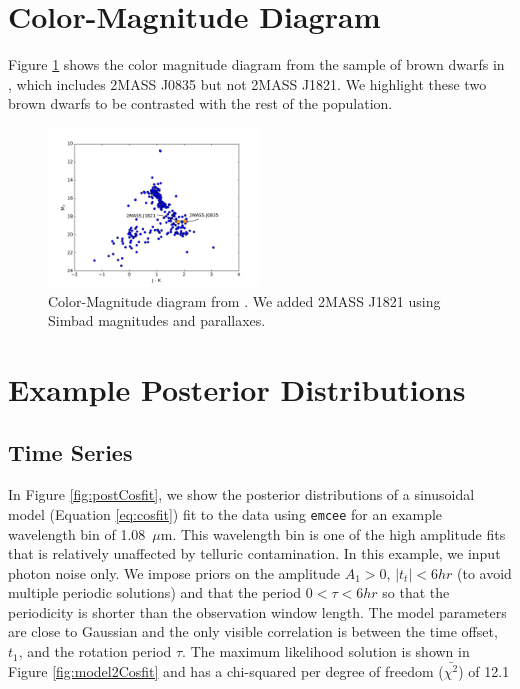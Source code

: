 \documentclass[twocolumn]{aastex6}
\begin{document}
\appendix
\clearpage
\pagebreak

\section{Color-Magnitude Diagram}

Figure \ref{fig:CMD} shows the color magnitude diagram from the sample of brown dwarfs in \citet{dupuy2012ltparallax}, which includes 2MASS J0835 but not 2MASS J1821.
We highlight these two brown dwarfs to be contrasted with the rest of the population.

\begin{figure}
\begin{centering}
\includegraphics[width=0.5\textwidth]{color_mag.pdf}
\caption{Color-Magnitude diagram from \citet{dupuy2012ltparallax}. We added 2MASS J1821 using Simbad magnitudes and parallaxes.}\label{fig:CMD}
\end{centering}
\end{figure}

\pagebreak
\section{Example Posterior Distributions}

\subsection{Time Series}
In Figure \ref{fig:postCosfit}, we show the posterior distributions of a sinusoidal model (Equation \ref{eq:cosfit}) fit to the data using \texttt{emcee} \citep{foreman-mackey2013emcee} for an example wavelength bin of 1.08~$\mu$m.
This wavelength bin is one of the high amplitude fits that is relatively unaffected by telluric contamination.
In this example, we input photon noise only.
We impose priors on the amplitude $A_1 > 0$, $|t_t| < 6 hr$ (to avoid multiple periodic solutions) and that the period $0 < \tau < 6 hr$ so that the periodicity is shorter than the observation window length.
The model parameters are close to Gaussian and the only visible correlation is between the time offset, $t_1$, and the rotation period $\tau$.
The maximum likelihood solution is shown in Figure \ref{fig:model2Cosfit} and has a chi-squared per degree of freedom ($\bar{\chi^2}$) of 12.1
\end{document}
